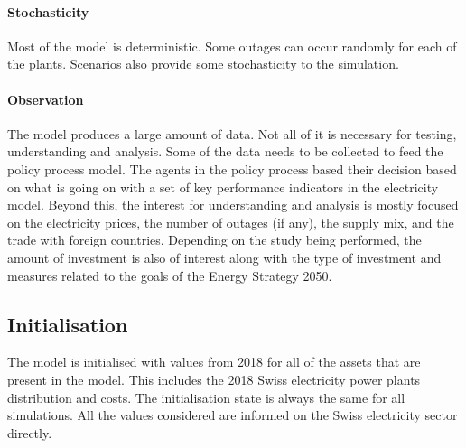 \paragraph{Stochasticity}

Most of the model is deterministic. Some outages can occur randomly for each of the plants. Scenarios also provide some stochasticity to the simulation.

\paragraph{Observation}

The model produces a large amount of data. Not all of it is necessary for testing, understanding and analysis. Some of the data needs to be collected to feed the policy process model. The agents in the policy process based their decision based on what is going on with a set of key performance indicators in the electricity model. Beyond this, the interest for understanding and analysis is mostly focused on the electricity prices, the number of outages (if any), the supply mix, and the trade with foreign countries. Depending on the study being performed, the amount of investment is also of interest along with the type of investment and measures related to the goals of the Energy Strategy 2050.


\subsection{Initialisation}
\label{sec:initialisation}

The model is initialised with values from 2018 for all of the assets that are present in the model. This includes the 2018 Swiss electricity power plants distribution and costs. The initialisation state is always the same for all simulations. All the values considered are informed on the Swiss electricity sector directly.

